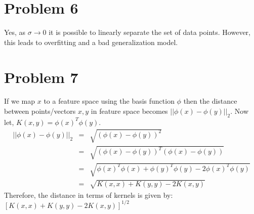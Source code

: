 \documentclass[10pt, a4paper, fleqn]{article}
\begin{document}
\section{Problem 6}
Yes, as $\sigma \rightarrow 0$ it is possible to linearly separate the set of data points. However, this leads to overfitting and a bad generalization model.
\section{Problem 7}
If we map $x$ to a feature space using the basis function $\phi$ then the distance between points/vectors $x,y$ in feature space becomes
$||\phi(x)-\phi(y)||_2$.
Now let, $K(x,y) = \phi(x)^T\phi(y)$.
\begin{eqnarray*}
||\phi(x)-\phi(y)||_2&=&\sqrt{(\phi(x)-\phi(y))^2}\\
&=&\sqrt{(\phi(x)-\phi(y))^T(\phi(x)-\phi(y))}\\
&=&\sqrt{\phi(x)^T\phi(x)+\phi(y)^T\phi(y)-2\phi(x)^T\phi(y)}\\
&=&\sqrt{K(x,x)+K(y,y)-2K(x,y)}
\end{eqnarray*}
Therefore, the distance in terms of kernels is given by: $[K(x,x)+K(y,y)-2K(x,y)]^\text{1/2}$
\end{document}
